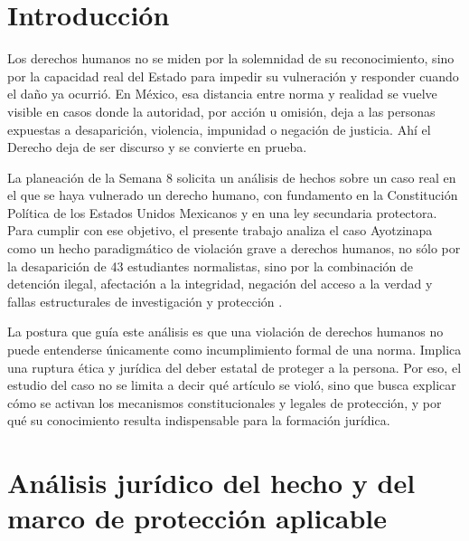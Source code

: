 \documentclass[
	spanish,
	letterpaper, oneside
]{article}
\begin{document}
\section{Introducción}

Los derechos humanos no se miden por la solemnidad de su reconocimiento, sino por la capacidad real del Estado para impedir su vulneración y responder cuando el daño ya ocurrió. En México, esa distancia entre norma y realidad se vuelve visible en casos donde la autoridad, por acción u omisión, deja a las personas expuestas a desaparición, violencia, impunidad o negación de justicia. Ahí el Derecho deja de ser discurso y se convierte en prueba.

La planeación de la Semana 8 solicita un análisis de hechos sobre un caso real en el que se haya vulnerado un derecho humano, con fundamento en la Constitución Política de los Estados Unidos Mexicanos y en una ley secundaria protectora. Para cumplir con ese objetivo, el presente trabajo analiza el caso Ayotzinapa como un hecho paradigmático de violación grave a derechos humanos, no sólo por la desaparición de 43 estudiantes normalistas, sino por la combinación de detención ilegal, afectación a la integridad, negación del acceso a la verdad y fallas estructurales de investigación y protección \citep{constitucionCPEUM2026,casoAyotzinapaCNDH2024}.

La postura que guía este análisis es que una violación de derechos humanos no puede entenderse únicamente como incumplimiento formal de una norma. Implica una ruptura ética y jurídica del deber estatal de proteger a la persona. Por eso, el estudio del caso no se limita a decir qué artículo se violó, sino que busca explicar cómo se activan los mecanismos constitucionales y legales de protección, y por qué su conocimiento resulta indispensable para la formación jurídica.

\section{Análisis jurídico del hecho y del marco de protección aplicable}

\end{document}
